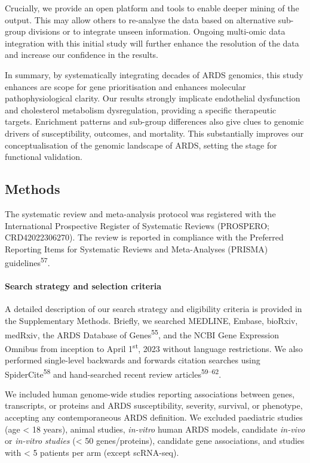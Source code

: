 \documentclass[
  11,
  a4paper,
]{article}
\let\oldparagraph\paragraph
\renewcommand{\paragraph}[1]{\oldparagraph{#1}\mbox{}}
\begin{document}
Crucially, we provide an open platform and tools to enable deeper mining
of the output. This may allow others to re-analyse the data based on
alternative sub-group divisions or to integrate unseen information.
Ongoing multi-omic data integration with this initial study will further
enhance the resolution of the data and increase our confidence in the
results.

In summary, by systematically integrating decades of ARDS genomics, this
study enhances are scope for gene prioritisation and enhances molecular
pathophysiological clarity. Our results strongly implicate endothelial
dysfunction and cholesterol metabolism dysregulation, providing a
specific therapeutic targets. Enrichment patterns and sub-group
differences also give clues to genomic drivers of susceptibility,
outcomes, and mortality. This substantially improves our
conceptualisation of the genomic landscape of ARDS, setting the stage
for functional validation.

\newpage

\hypertarget{methods}{%
\subsection{Methods}\label{methods}}

The systematic review and meta-analysis protocol was registered with the
International Prospective Register of Systematic Reviews (PROSPERO;
CRD42022306270). The review is reported in compliance with the Preferred
Reporting Items for Systematic Reviews and Meta-Analyses (PRISMA)
guidelines\textsuperscript{57}.

\hypertarget{search-strategy-and-selection-criteria}{%
\paragraph{Search strategy and selection
criteria}\label{search-strategy-and-selection-criteria}}

A detailed description of our search strategy and eligibility criteria
is provided in the Supplementary Methods. Briefly, we searched MEDLINE,
Embase, bioRxiv, medRxiv, the ARDS Database of
Genes\textsuperscript{55}, and the NCBI Gene Expression Omnibus from
inception to April 1\textsuperscript{st}, 2023 without language
restrictions. We also performed single-level backwards and forwards
citation searches using SpiderCite\textsuperscript{58} and hand-searched
recent review articles\textsuperscript{59--62}.

We included human genome-wide studies reporting associations between
genes, transcripts, or proteins and ARDS susceptibility, severity,
survival, or phenotype, accepting any contemporaneous ARDS definition.
We excluded paediatric studies (age \textless{} 18 years), animal
studies, \emph{in-vitro} human ARDS models, candidate \emph{in-vivo} or
\emph{in-vitro studies} (\textless{} 50 genes/proteins), candidate gene
associations, and studies with \textless{} 5 patients per arm (except
scRNA-seq).
\end{document}
